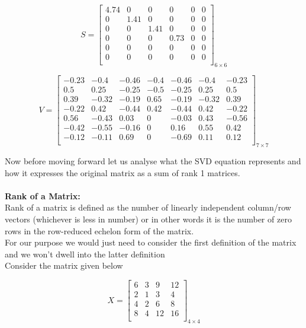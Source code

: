\documentclass{article}
\begin{document}
\begin{equation*}
    S = \begin{bmatrix}
        4.74 & 0 & 0 & 0 & 0 & 0 \\
        0 & 1.41 & 0 & 0 & 0 & 0 \\
        0 & 0 & 1.41 & 0 & 0 & 0 \\
        0 & 0 & 0 & 0.73 & 0 & 0 \\
        0 & 0 & 0 & 0 & 0 & 0 \\
        0 & 0 & 0 & 0 & 0 & 0 \\
    \end{bmatrix}_{6\times6}
\end{equation*}

\begin{equation*}
    V = \begin{bmatrix}
        -0.23 & -0.4 & -0.46 & -0.4 & -0.46 & -0.4 & -0.23 \\
        0.5 & 0.25 & -0.25 & -0.5 & -0.25 & 0.25 & 0.5 \\
        0.39 & -0.32 & -0.19 & 0.65 & -0.19 & -0.32 & 0.39 \\
        -0.22 & 0.42 & -0.44 & 0.42 & -0.44 & 0.42 & -0.22 \\
        0.56 & -0.43 & 0.03 & 0 & -0.03 & 0.43 & -0.56 \\
        -0.42 & -0.55 & -0.16 & 0 & 0.16 & 0.55 & 0.42 \\
        -0.12 & -0.11 & 0.69 & 0 & -0.69 & 0.11 & 0.12 \\
    \end{bmatrix}_{7\times7}
\end{equation*}

Now before moving forward let us analyse what the SVD equation represents and how it expresses the original matrix as a sum of rank 1 matrices.\\ \\

\textbf{Rank of a Matrix:} \\
Rank of a matrix is defined as the number of linearly independent column/row vectors (whichever is less in number) or in other words it is the number of zero rows in the row-reduced echelon form of the matrix. \\
For our purpose we would just need to consider the first definition of the matrix and we won't dwell into the latter definition \\
Consider the matrix given below

\begin{equation*}
    X = \begin{bmatrix}
        6 & 3 & 9 & 12 \\
        2 & 1 & 3 & 4 \\
        4 & 2 & 6 & 8 \\
        8 & 4 & 12 & 16 \\
    \end{bmatrix}_{4\times4}
\end{equation*}
\end{document}
